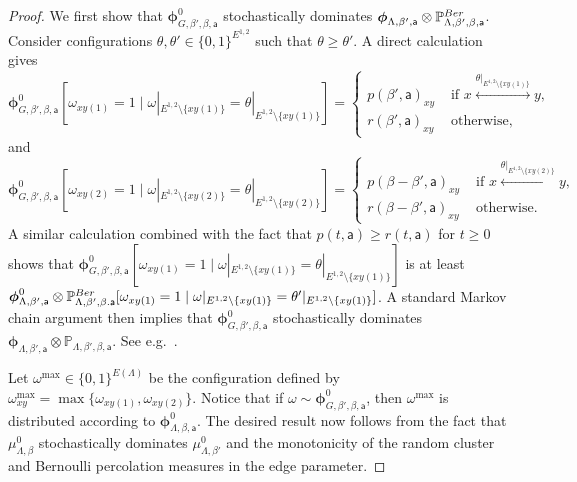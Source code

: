 \documentclass[11pt,a4paper]{article}
\theoremstyle{definition}
\numberwithin{equation}{section}
\begin{document}
\begin{proof}
We first show that $\boldsymbol{\phi}^0_{G,\beta',\beta,\mathsf{a}}$ stochastically dominates $\boldsymbol{\phi}_{\Lambda,\beta',\mathsf{a}}\otimes \mathbb{P}^{\rm Ber}_{\Lambda,\beta',\beta,\mathsf{a}}$. Consider configurations $\theta,\theta'\in \{0,1\}^{E^{1,2}}$ such that $\theta\geq \theta'$. A direct calculation gives
\begin{equation}
\boldsymbol\phi^{0}_{G,\beta',\beta,\mathsf{a}}[\omega_{xy(1)}=1 \mid \omega|_{E^{1,2}\setminus\{xy(1)\}}=\theta|_{E^{1,2}\setminus\{xy(1)\}}]=\begin{cases} p(\beta',\mathsf{a})_{xy} &\text{ if $x\overset{\theta|_{E^{1,2}\setminus\{xy(1)\}}}{\longleftrightarrow} y$,}\\
\displaystyle r(\beta',\mathsf{a})_{xy}&\text{ otherwise,}\end{cases}
\end{equation}
and 
\begin{equation}
\boldsymbol\phi^{0}_{G,\beta',\beta,\mathsf{a}}[\omega_{xy(2)}=1 \mid \omega|_{E^{1,2}\setminus\{xy(2)\}}=\theta|_{E^{1,2}\setminus\{xy(2)\}}]=\begin{cases} p(\beta-\beta',\mathsf{a})_{xy} &\text{ if $x\overset{\theta|_{E^{1,2}\setminus\{xy(2)\}}}{\longleftrightarrow} y$,}\\
\displaystyle r(\beta-\beta',\mathsf{a})_{xy}&\text{ otherwise.}\end{cases}
\end{equation}
A similar calculation combined with the fact that $p(t,\mathsf{a})\geq r(t,\mathsf{a})$ for $t\geq 0$ shows that $\boldsymbol\phi^{0}_{G,\beta',\beta,\mathsf{a}}[\omega_{xy(1)}=1 \mid \omega|_{E^{1,2}\setminus\{xy(1)\}}=\theta|_{E^{1,2}\setminus\{xy(1)\}}]$ is at least $\boldsymbol\phi^{0}_{\Lambda,\beta',\mathsf{a}}\otimes \mathbb{P}^{\rm Ber}_{\Lambda,\beta',\beta.\mathsf{a}}[\omega_{xy(1)}=1 \mid \omega|_{E^{1,2}\setminus\{xy(1)\}}=\theta'|_{E^{1,2}\setminus\{xy(1)\}}]$. A standard Markov chain argument then implies that $\boldsymbol{\phi}^0_{G,\beta',\beta,\mathsf{a}}$ stochastically dominates $\boldsymbol{\phi}_{\Lambda,\beta',\mathsf{a}}\otimes \mathbb{P}_{\Lambda,\beta',\beta,\mathsf{a}}$. See e.g.\ \cite[Lemma 1.5]{DuminilLecturesOnIsingandPottsModels2019}.

Let $\omega^{\max} \in \{0,1\}^{E(\Lambda)}$ be the configuration defined by
$\omega^{\max}_{xy}=\max\{\omega_{xy(1)},\omega_{xy(2)}\}$. Notice that if $\omega\sim \boldsymbol{\phi}^0_{G,\beta',\beta,\mathsf{a}}$, then $\omega^{\max}$ is distributed according to $\boldsymbol{\phi}^0_{\Lambda,\beta,\mathsf{a}}$.
The desired result now follows from the fact that $\mu_{\Lambda,\beta}^0$ stochastically dominates $\mu_{\Lambda,\beta'}^0$ and the monotonicity of the random cluster and Bernoulli percolation measures in the edge parameter.
\end{proof}
\end{document}
